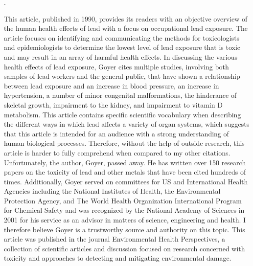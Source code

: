 \documentclass{article}
\begin{document}
. 
\bigskip

This article, published in 1990, provides its readers with an objective overview of the human health effects of lead with a focus on occupational lead exposure. The article focuses on identifying and communicating the methods for toxicologists and epidemiologists to determine the lowest level of lead exposure that is toxic and may result in an array of harmful health effects. In discussing the various health effects of lead exposure, Goyer cites multiple studies, involving both samples of lead workers and the general public, that have shown a relationship between lead exposure and an increase in blood pressure, an increase in hypertension, a number of minor congenital malformations, the hinderance of skeletal growth, impairment to the kidney, and impairment to vitamin D metabolism. This article contains specific scientific vocabulary when describing the different ways in which lead affects a variety of organ systems, which suggests that this article is intended for an audience with a strong understanding of human biological processes. Therefore, without the help of outside research, this article is harder to fully comprehend when compared to my other citations. Unfortunately, the author, Goyer, passed away. He has written over 150 research papers on the toxicity of lead and other metals that have been cited hundreds of times. Additionally, Goyer served on committees for US and International Health Agencies including the National Institutes of Health, the Environmental Protection Agency, and The World Health Organization International Program for Chemical Safety and was recognized by the National Academy of Sciences in 2001 for his service as an advisor in matters of science, engineering and health. I therefore believe Goyer is a trustworthy source and authority on this topic. This article was published in the journal Environmental Health Perspectives, a collection of scientific articles and discussion focused on research concerned with toxicity and approaches to detecting and mitigating environmental damage. 
\bigskip
\end{document}
